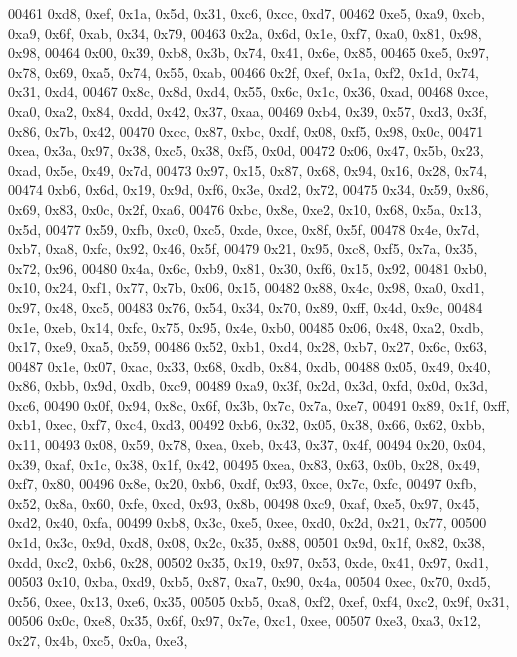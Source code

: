 \begin{DoxyCode}
00461   0xd8, 0xef, 0x1a, 0x5d, 0x31, 0xc6, 0xcc, 0xd7,
00462   0xe5, 0xa9, 0xcb, 0xa9, 0x6f, 0xab, 0x34, 0x79,
00463   0x2a, 0x6d, 0x1e, 0xf7, 0xa0, 0x81, 0x98, 0x98,
00464   0x00, 0x39, 0xb8, 0x3b, 0x74, 0x41, 0x6e, 0x85,
00465   0xe5, 0x97, 0x78, 0x69, 0xa5, 0x74, 0x55, 0xab,
00466   0x2f, 0xef, 0x1a, 0xf2, 0x1d, 0x74, 0x31, 0xd4,
00467   0x8c, 0x8d, 0xd4, 0x55, 0x6c, 0x1c, 0x36, 0xad,
00468   0xce, 0xa0, 0xa2, 0x84, 0xdd, 0x42, 0x37, 0xaa,
00469   0xb4, 0x39, 0x57, 0xd3, 0x3f, 0x86, 0x7b, 0x42,
00470   0xcc, 0x87, 0xbc, 0xdf, 0x08, 0xf5, 0x98, 0x0c,
00471   0xea, 0x3a, 0x97, 0x38, 0xc5, 0x38, 0xf5, 0x0d,
00472   0x06, 0x47, 0x5b, 0x23, 0xad, 0x5e, 0x49, 0x7d,
00473   0x97, 0x15, 0x87, 0x68, 0x94, 0x16, 0x28, 0x74,
00474   0xb6, 0x6d, 0x19, 0x9d, 0xf6, 0x3e, 0xd2, 0x72,
00475   0x34, 0x59, 0x86, 0x69, 0x83, 0x0c, 0x2f, 0xa6,
00476   0xbc, 0x8e, 0xe2, 0x10, 0x68, 0x5a, 0x13, 0x5d,
00477   0x59, 0xfb, 0xc0, 0xc5, 0xde, 0xce, 0x8f, 0x5f,
00478   0x4e, 0x7d, 0xb7, 0xa8, 0xfc, 0x92, 0x46, 0x5f,
00479   0x21, 0x95, 0xc8, 0xf5, 0x7a, 0x35, 0x72, 0x96,
00480   0x4a, 0x6c, 0xb9, 0x81, 0x30, 0xf6, 0x15, 0x92,
00481   0xb0, 0x10, 0x24, 0xf1, 0x77, 0x7b, 0x06, 0x15,
00482   0x88, 0x4c, 0x98, 0xa0, 0xd1, 0x97, 0x48, 0xc5,
00483   0x76, 0x54, 0x34, 0x70, 0x89, 0xff, 0x4d, 0x9c,
00484   0x1e, 0xeb, 0x14, 0xfc, 0x75, 0x95, 0x4e, 0xb0,
00485   0x06, 0x48, 0xa2, 0xdb, 0x17, 0xe9, 0xa5, 0x59,
00486   0x52, 0xb1, 0xd4, 0x28, 0xb7, 0x27, 0x6c, 0x63,
00487   0x1e, 0x07, 0xac, 0x33, 0x68, 0xdb, 0x84, 0xdb,
00488   0x05, 0x49, 0x40, 0x86, 0xbb, 0x9d, 0xdb, 0xc9,
00489   0xa9, 0x3f, 0x2d, 0x3d, 0xfd, 0x0d, 0x3d, 0xc6,
00490   0x0f, 0x94, 0x8c, 0x6f, 0x3b, 0x7c, 0x7a, 0xe7,
00491   0x89, 0x1f, 0xff, 0xb1, 0xec, 0xf7, 0xc4, 0xd3,
00492   0xb6, 0x32, 0x05, 0x38, 0x66, 0x62, 0xbb, 0x11,
00493   0x08, 0x59, 0x78, 0xea, 0xeb, 0x43, 0x37, 0x4f,
00494   0x20, 0x04, 0x39, 0xaf, 0x1c, 0x38, 0x1f, 0x42,
00495   0xea, 0x83, 0x63, 0x0b, 0x28, 0x49, 0xf7, 0x80,
00496   0x8e, 0x20, 0xb6, 0xdf, 0x93, 0xce, 0x7c, 0xfc,
00497   0xfb, 0x52, 0x8a, 0x60, 0xfe, 0xcd, 0x93, 0x8b,
00498   0xc9, 0xaf, 0xe5, 0x97, 0x45, 0xd2, 0x40, 0xfa,
00499   0xb8, 0x3c, 0xe5, 0xee, 0xd0, 0x2d, 0x21, 0x77,
00500   0x1d, 0x3c, 0x9d, 0xd8, 0x08, 0x2c, 0x35, 0x88,
00501   0x9d, 0x1f, 0x82, 0x38, 0xdd, 0xc2, 0xb6, 0x28,
00502   0x35, 0x19, 0x97, 0x53, 0xde, 0x41, 0x97, 0xd1,
00503   0x10, 0xba, 0xd9, 0xb5, 0x87, 0xa7, 0x90, 0x4a,
00504   0xec, 0x70, 0xd5, 0x56, 0xee, 0x13, 0xe6, 0x35,
00505   0xb5, 0xa8, 0xf2, 0xef, 0xf4, 0xc2, 0x9f, 0x31,
00506   0x0c, 0xe8, 0x35, 0x6f, 0x97, 0x7e, 0xc1, 0xee,
00507   0xe3, 0xa3, 0x12, 0x27, 0x4b, 0xc5, 0x0a, 0xe3,

\end{DoxyCode}

